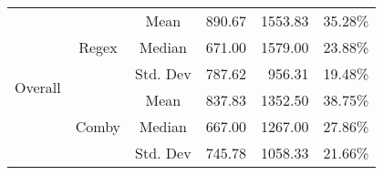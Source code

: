 \documentclass[sigconf,review, anonymous]{acmart}
\begin{document}
{\begin{table}[hbtp]
{\begin{tabular}{|c|c|c|r|r|r|}
\multirow{6}{*}{Overall} & \multirow{3}{*}{Regex} & Mean & 890.67 &	1553.83 & 35.28\%\\\cline{3-6}
    &   &  Median & 671.00 & 1579.00 & 23.88\%  \\\cline{3-6}
    &   &  Std. Dev & 787.62 & 956.31 & 19.48\%  \\\cline{2-6}

 & \multirow{3}{*}{Comby} & Mean & 837.83 & 1352.50 & 38.75\% \\\cline{3-6}
    &   &  Median & 667.00 & 1267.00 & 27.86\%  \\\cline{3-6}
    &   &  Std. Dev & 745.78 & 1058.33	& 21.66\%  \\\hline

\end{tabular}
}

\end{table}

  

\begin{table}[hbtp]
\centering
\caption{Java (Regex vs. Comby)}
\label{tab:table_java1}
\end{table}}
\end{document}
